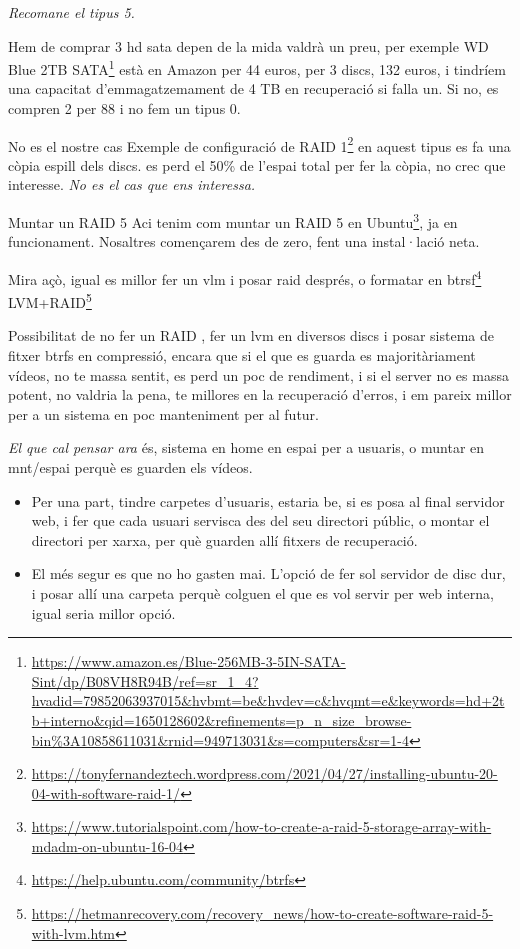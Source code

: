 \documentclass[
  10pt,
]{krantz}
\DeclareRobustCommand{\href}[2]{#2\footnote{\url{#1}}}
\providecommand{\tightlist}{%
  \setlength{\itemsep}{0pt}\setlength{\parskip}{0pt}}
\begin{document}
\emph{Recomane el tipus 5.}

Hem de comprar 3 hd sata depen de la mida valdrà un preu, per exemple \href{https://www.amazon.es/Blue-256MB-3-5IN-SATA-Sint/dp/B08VH8R94B/ref=sr_1_4?hvadid=79852063937015\&hvbmt=be\&hvdev=c\&hvqmt=e\&keywords=hd+2tb+interno\&qid=1650128602\&refinements=p_n_size_browse-bin\%3A10858611031\&rnid=949713031\&s=computers\&sr=1-4}{WD Blue 2TB SATA} està en Amazon per 44 euros, per 3 discs, 132 euros, i tindríem una capacitat d'emmagatzemament de 4 TB en recuperació si falla un. Si no, es compren 2 per 88 i no fem un tipus 0.

\begin{rmdnote}{No es el nostre cas}
Exemple de configuració de \href{https://tonyfernandeztech.wordpress.com/2021/04/27/installing-ubuntu-20-04-with-software-raid-1/}{RAID 1} en aquest tipus es fa una còpia espill dels discs. es perd el 50\% de l'espai total per fer la còpia, no crec que interesse. \emph{No es el cas que ens interessa.}

\end{rmdnote}

\begin{rmdinfo}{Muntar un RAID 5}
Aci tenim com muntar un \href{https://www.tutorialspoint.com/how-to-create-a-raid-5-storage-array-with-mdadm-on-ubuntu-16-04}{RAID 5 en Ubuntu}, ja en funcionament. Nosaltres començarem des de zero, fent una instal·lació neta.

\end{rmdinfo}

Mira açò, igual es millor fer un vlm i posar raid després, o formatar en \href{https://help.ubuntu.com/community/btrfs}{btrsf} \href{https://hetmanrecovery.com/recovery_news/how-to-create-software-raid-5-with-lvm.htm}{LVM+RAID}

Possibilitat de no fer un RAID , fer un lvm en diversos discs i posar sistema de fitxer btrfs en compressió, encara que si el que es guarda es majoritàriament vídeos, no te massa sentit, es perd un poc de rendiment, i si el server no es massa potent, no valdria la pena, te millores en la recuperació d'erros, i em pareix millor per a un sistema en poc manteniment per al futur.

\emph{El que cal pensar ara} és, sistema en home en espai per a usuaris, o muntar en mnt/espai perquè es guarden els vídeos.

\begin{itemize}
\tightlist
\item
  Per una part, tindre carpetes d'usuaris, estaria be, si es posa al final servidor web, i fer que cada usuari servisca des del seu directori públic, o montar el directori per xarxa, per què guarden allí fitxers de recuperació.
\item
  El més segur es que no ho gasten mai. L'opció de fer sol servidor de disc dur, i posar allí una carpeta perquè colguen el que es vol servir per web interna, igual seria millor opció.
\end{itemize}
\end{document}
